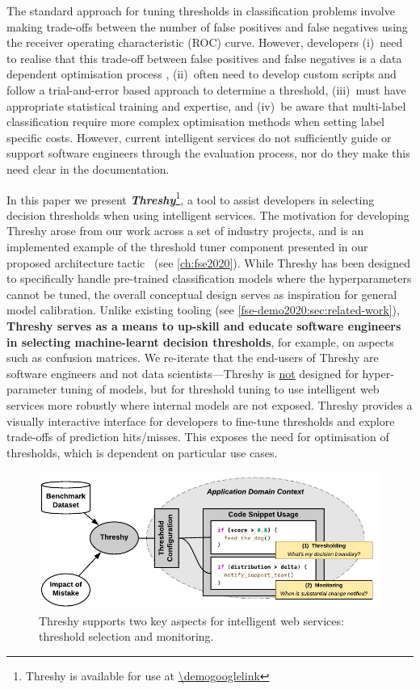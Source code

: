 The standard approach for tuning thresholds in classification problems involve making trade-offs between the number of false positives and false negatives using the receiver operating characteristic (ROC) curve. However, developers (i)~need to realise that this trade-off between false positives and false negatives is a data dependent optimisation process \citep{sculley2011detecting}, (ii)~often need to develop custom scripts and follow a trial-and-error based approach to determine a threshold, (iii)~must have appropriate statistical training and expertise, and (iv)~be aware that multi-label classification require more complex optimisation methods when setting label specific costs. However, current intelligent services do not sufficiently guide or support software engineers through the evaluation process, nor do they make this need clear in the documentation. 

In this paper we present \textit{\bfseries Threshy}\footnote{Threshy is available for use at \url{\demogooglelink}}, a tool to assist developers in selecting decision thresholds when using intelligent services. The motivation for developing Threshy arose from our work across a set of industry projects, and is an implemented example of the threshold tuner component presented in our proposed architecture tactic~\citep{Cummaudo:2020fse} (see \cref{ch:fse2020}). While Threshy has been designed to specifically handle pre-trained classification  models where the hyperparameters cannot be tuned, the overall conceptual design serves as inspiration for general model calibration.  Unlike existing tooling (see \cref{fse-demo2020:sec:related-work}), \textbf{Threshy serves as a means to up-skill and educate software engineers in selecting machine-learnt decision thresholds}, for example, on aspects such as confusion matrices. We re-iterate that the end-users of Threshy are software engineers and not data scientists---Threshy is \uline{not} designed for hyper-parameter tuning of models, but for threshold tuning to use intelligent web services more robustly where internal models are not exposed.
Threshy provides a visually interactive interface for developers to fine-tune thresholds and explore trade-offs of prediction hits/misses. This exposes the need for optimisation of thresholds, which is dependent on particular use cases.

\begin{figure}
    \centering
    \includegraphics[width=.9\linewidth]{usage-thresholding-monitoring.pdf}
    \caption[Threshy supports threshold selection and monitoring]{Threshy supports two key aspects for intelligent web services: threshold selection and monitoring.}
    \label{fse-demo2020:fig:usage-thresholding-monitoring}
\end{figure}

